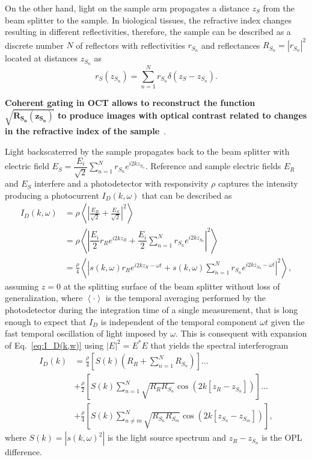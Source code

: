 On the other hand, light on the sample arm propagates a distance $z_S$ from the beam splitter to the sample. In biological tissues, the refractive index changes resulting in different reflectivities, therefore, the sample can be described as a discrete number $N$ of reflectors with reflectivities $r_{S_n}$ and reflectances $R_{S_n}=|r_{S_n}|^2$ located at distances $z_{S_n}$ as
\begin{equation}
    r_S(z_{S_n}) = \sum_{n=1}^N r_{S_n}\delta\left(z_S-z_{S_n}\right).
\end{equation}

\textbf{Coherent gating in OCT allows to reconstruct the function $\mathbf{\sqrt{R_{S_n}(z_{S_n})}}$ to produce images with optical contrast related to changes in the refractive index of the sample}~\cite{Izatt2015_Theory}.

Light backscaterred by the sample propagates back to the beam splitter with electric field $E_S=\dfrac{E_i}{\sqrt{2}}\sum\limits_{n=1}^Nr_{S_n}e^{i2kz_{S_n}}$. Reference and sample electric fields $E_R$ and $E_S$ interfere and a photodetector with responsivity $\rho$ captures the intensity producing a photocurrent $I_D(k, \omega)$ that can be described as~\cite{Izatt2015_Theory}
\begin{align}\label{eq:I_D(k,w)}
    I_D(k, \omega) &= \rho\left<\left|\frac{E_R}{\sqrt{2}} + \frac{E_S}{\sqrt{2}}\right|^2\right> \nonumber\\
    & = \rho\left<\left|\dfrac{E_i}{2} r_R e^{i2kz_R} + \dfrac{E_i}{2}\sum\limits_{n=1}^Nr_{S_n}e^{i2kz_{S_n}}\right|^2\right> \\
    & = \frac{\rho}{4}\left<\left|s(k,\omega) r_R e^{i2kz_R-\omega t} + s(k,\omega)\sum\limits_{n=1}^Nr_{S_n}e^{i2kz_{S_n}-\omega t}\right|^2\right>, \nonumber
\end{align}
assuming $z=0$ at the splitting surface of the beam splitter without loss of generalization, where $\left<\cdot\right>$ is the temporal averaging performed by the photodetector during the integration time of a single measurement, that is long enough to expect that $I_D$ is independent of the temporal component $\omega t$ given the fast temporal oscillation of light imposed by $\omega$. This is consequent with expansion of Eq.~\eqref{eq:I_D(k,w)} using $|E|^2 = E^*E$ that yields the spectral interferogram~\cite{Izatt2015_Theory}
\begin{align}\label{eq:I_D(k)}
I_D(k) &= \frac{\rho}{4}\left[S(k)\left(R_R + \sum_{n=1}^N R_{S_n}\right)\right] ... \nonumber\\
&+ \frac{\rho}{2} \left[S(k)\sum_{n=1}^N\sqrt{R_RR_{S_n}}\cos\left(2k\left[z_R-z_{S_n}\right]\right)\right] ... \\
&+ \frac{\rho}{4}\left[S(k)\sum_{n\neq m}^N\sqrt{R_{S_n}R_{S_m}}\cos\left(2k\left[z_{S_n}-z_{S_m}\right]\right)\right], \nonumber
\end{align}
where $S(k) = |s(k,\omega)^2|$ is the light source spectrum and $z_R-z_{S_n}$ is the OPL difference.

